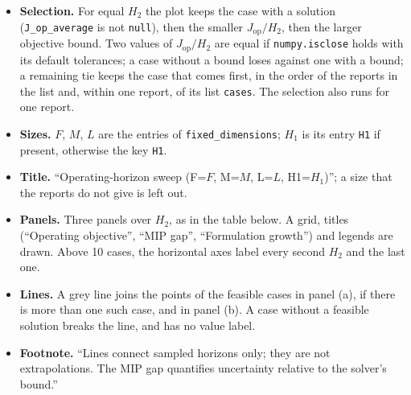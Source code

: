 \tabend

\tabend

\begin{itemize}[nosep]
  \item \textbf{Selection.} For equal $H_2$ the plot keeps the case with a solution (\texttt{J\_op\_average} is not \texttt{null}), then the smaller $J_{\mathrm{op}}/H_2$, then the larger objective bound. Two values of $J_{\mathrm{op}}/H_2$ are equal if \texttt{numpy.isclose} holds with its default tolerances; a case without a bound loses against one with a bound; a remaining tie keeps the case that comes first, in the order of the reports in the list and, within one report, of its list \texttt{cases}. The selection also runs for one report.
  \item \textbf{Sizes.} $F$, $M$, $L$ are the entries of \texttt{fixed\_dimensions}; $H_1$ is its entry \texttt{H1} if present, otherwise the key \texttt{H1}.
  \item \textbf{Title.} ``Operating-horizon sweep (F=$F$, M=$M$, L=$L$, H1=$H_1$)''; a size that the reports do not give is left out.
  \item \textbf{Panels.} Three panels over $H_2$, as in the table below. A grid, titles (``Operating objective'', ``MIP gap'', ``Formulation growth'') and legends are drawn. Above 10 cases, the horizontal axes label every second $H_2$ and the last one.
  \item \textbf{Lines.} A grey line joins the points of the feasible cases in panel (a), if there is more than one such case, and in panel (b). A case without a feasible solution breaks the line, and has no value label.
  \item \textbf{Footnote.} ``Lines connect sampled horizons only; they are not extrapolations. The MIP gap quantifies uncertainty relative to the solver's bound.''
\end{itemize}

